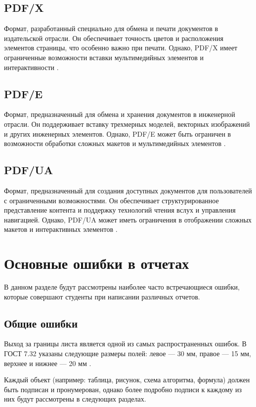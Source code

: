 \subsection{PDF/X}
Формат, разработанный специально для обмена и печати документов в издательской отрасли. Он обеспечивает точность цветов и расположения элементов страницы, что особенно важно при печати. Однако, PDF/X имеет ограниченные возможности вставки мультимедийных элементов и интерактивности \cite{abdobe_PDF}.


\subsection{PDF/E}
Формат, предназначенный для обмена и хранения документов в инженерной отрасли. Он поддерживает вставку трехмерных моделей, векторных изображений и других инженерных элементов. Однако, PDF/E может быть ограничен в возможности обработки сложных макетов и мультимедийных элементов \cite{abdobe_PDF}.
\subsection{PDF/UA}
Формат, предназначенный для создания доступных документов для пользователей с ограниченными возможностями. Он обеспечивает структурированное представление контента и поддержку технологий чтения вслух и управления навигацией. Однако, PDF/UA может иметь ограничения в отображении сложных макетов и интерактивных элементов \cite{abdobe_PDF}.






\section{Основные ошибки в отчетах}
В данном разделе будут рассмотрены наиболее часто встречающиеся ошибки, которые совершают студенты при написании различных отчетов.

\subsection{Общие ошибки}
Выход за границы листа является одной из самых распространенных ошибок. В ГОСТ 7.32 указаны следующие размеры полей: левое — 30 мм, правое — 15 мм, верхнее и нижнее — 20 мм \cite{GOST732}.

Каждый объект (например: таблица, рисунок, схема алгоритма, формула) должен быть подписан и пронумерован, однако более подробно подписи к каждому из них будут рассмотрены в следующих разделах.

